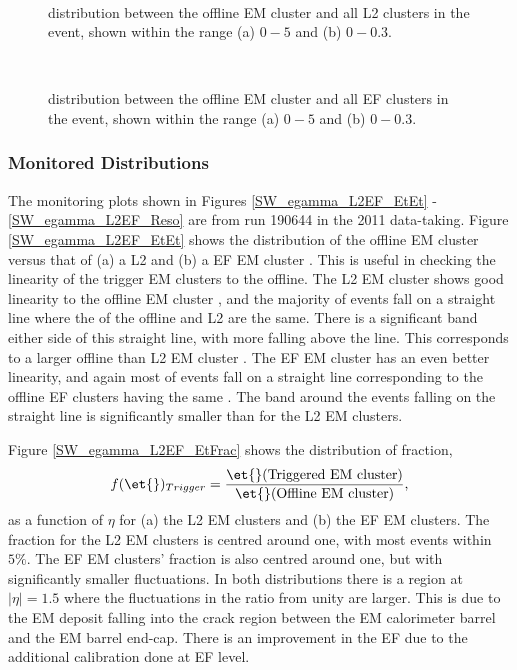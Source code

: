 \begin{figure}
\centering
\mbox{
}
\caption[\dr{} between offline and L2 EM object]{
\dr{} distribution between the offline EM cluster and all L2 clusters in the event, shown within the range (a) $0 - 5$ and (b) $0 - 0.3$. 
\label{SW_egamma_L2_dR}}
\medskip
\mbox{
}
\caption[\dr{} between offline and EF EM object]{
\dr{} distribution between the offline EM cluster and all EF clusters in the event, shown within the range (a) $0 - 5$ and (b) $0 - 0.3$. 
\label{SW_egamma_EF_dR}}
\end{figure}




\subsubsection{Monitored Distributions}


The monitoring plots shown in Figures \ref{SW_egamma_L2EF_EtEt} -\ref{SW_egamma_L2EF_Reso} are from run 190644 in the  2011 data-taking.
Figure \ref{SW_egamma_L2EF_EtEt} shows the distribution of the offline EM cluster \et{} versus that of (a) a L2 and (b) a EF EM cluster \et{}.
This is useful in checking the linearity of the trigger EM clusters to the offline. 
The L2 EM cluster \et{} shows good linearity to the offline EM cluster \et{}, and the majority of events fall on a straight line where the \et{} of the offline and L2 are the same.
There is a significant band either side of this straight line, with more falling above the line.
This corresponds to a larger offline \et{} than L2 EM cluster \et{}.
The EF EM cluster \et{} has an even better linearity, and again most of events fall on a straight line corresponding to the offline EF clusters having the same \et{}.
The band around the events falling on the straight line is significantly smaller than for the L2 EM clusters.


Figure \ref{SW_egamma_L2EF_EtFrac} shows the distribution of \et{} fraction,
\begin{equation}
f(\et{})_{Trigger}=\frac{\et{}(\rm{Triggered~EM~cluster})}{\et{}(\rm{Offline~EM~cluster})},
\label{SW:EtFrac}
\end{equation}
as a function of $\eta{}$ for (a) the L2 EM clusters and (b) the EF EM clusters.
The \et{} fraction for the L2 EM clusters is centred around one, with most events within $5\%$.
The EF EM clusters' \et{} fraction is also centred around one, but with significantly smaller fluctuations.
In both distributions there is a region at $|\eta{}|=1.5$ where the fluctuations in the ratio from unity are larger.
This is due to the EM deposit falling into the crack region between the EM calorimeter barrel and the EM barrel end-cap.
There is an improvement in the EF due to the additional calibration done at EF level. 


